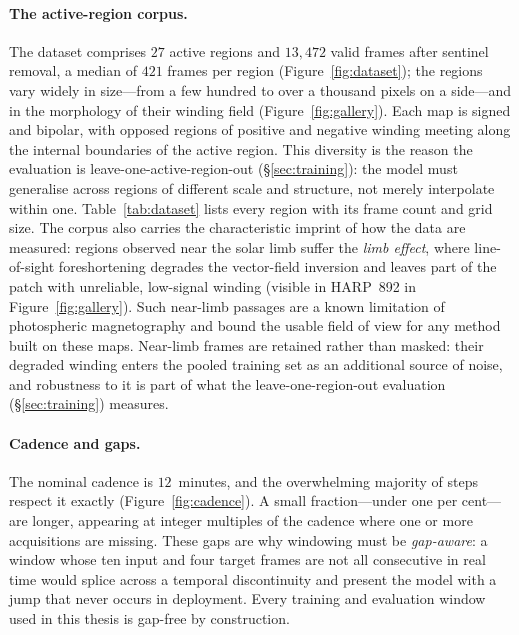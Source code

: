 \paragraph{The active-region corpus.}
The dataset comprises $27$ active regions and $13{,}472$ valid frames after
sentinel removal, a median of $421$ frames per region
(Figure~\ref{fig:dataset}); the regions vary widely in size---from a few hundred
to over a thousand pixels on a side---and in the morphology of their winding
field (Figure~\ref{fig:gallery}). Each map is signed and bipolar, with opposed
regions of positive and negative winding meeting along the internal boundaries of
the active region. This diversity is the reason the evaluation is
leave-one-active-region-out (\S\ref{sec:training}): the model must generalise
across regions of different scale and structure, not merely interpolate within
one. Table~\ref{tab:dataset} lists every region with its frame count and grid
size. The corpus also carries the characteristic imprint of how the data are
measured: regions observed near the solar limb suffer the \emph{limb effect},
where line-of-sight foreshortening degrades the vector-field inversion and leaves
part of the patch with unreliable, low-signal winding (visible in HARP~892 in
Figure~\ref{fig:gallery}). Such near-limb passages are a known limitation of
photospheric magnetography and bound the usable field of view for any method
built on these maps. Near-limb frames are retained rather than masked: their
degraded winding enters the pooled training set as an additional source of noise,
and robustness to it is part of what the leave-one-region-out evaluation
(\S\ref{sec:training}) measures.





\paragraph{Cadence and gaps.}
The nominal cadence is $12$~minutes, and the overwhelming majority of steps
respect it exactly (Figure~\ref{fig:cadence}). A small fraction---under one per
cent---are longer, appearing at integer multiples of the cadence where one or
more acquisitions are missing. These gaps are why windowing must be
\emph{gap-aware}: a window whose ten input and four target frames are not all
consecutive in real time would splice across a temporal discontinuity and
present the model with a jump that never occurs in deployment. Every training and
evaluation window used in this thesis is gap-free by construction.

